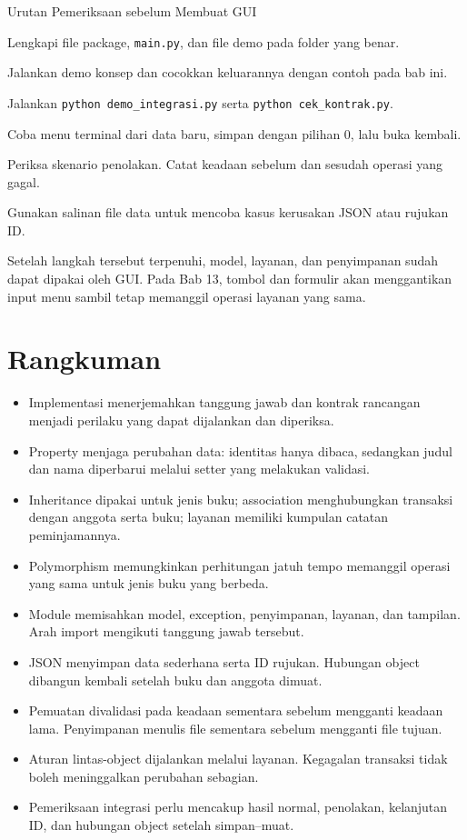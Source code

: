 \begin{langkah}{Urutan Pemeriksaan sebelum Membuat GUI}
  \item Lengkapi file package, \texttt{main.py}, dan file demo pada folder yang benar.
  \item Jalankan demo konsep dan cocokkan keluarannya dengan contoh pada bab ini.
  \item Jalankan \texttt{python demo\_integrasi.py} serta \texttt{python cek\_kontrak.py}.
  \item Coba menu terminal dari data baru, simpan dengan pilihan 0, lalu buka kembali.
  \item Periksa skenario penolakan. Catat keadaan sebelum dan sesudah operasi yang gagal.
  \item Gunakan salinan file data untuk mencoba kasus kerusakan JSON atau rujukan ID.
\end{langkah}

Setelah langkah tersebut terpenuhi, model, layanan, dan penyimpanan sudah dapat dipakai oleh GUI. Pada Bab 13, tombol dan formulir akan menggantikan input menu sambil tetap memanggil operasi layanan yang sama.

\section{Rangkuman}

\begin{itemize}
  \item Implementasi menerjemahkan tanggung jawab dan kontrak rancangan menjadi perilaku yang dapat dijalankan dan diperiksa.
  \item Property menjaga perubahan data: identitas hanya dibaca, sedangkan judul dan nama diperbarui melalui setter yang melakukan validasi.
  \item Inheritance dipakai untuk jenis buku; association menghubungkan transaksi dengan anggota serta buku; layanan memiliki kumpulan catatan peminjamannya.
  \item Polymorphism memungkinkan perhitungan jatuh tempo memanggil operasi yang sama untuk jenis buku yang berbeda.
  \item Module memisahkan model, exception, penyimpanan, layanan, dan tampilan. Arah import mengikuti tanggung jawab tersebut.
  \item JSON menyimpan data sederhana serta ID rujukan. Hubungan object dibangun kembali setelah buku dan anggota dimuat.
  \item Pemuatan divalidasi pada keadaan sementara sebelum mengganti keadaan lama. Penyimpanan menulis file sementara sebelum mengganti file tujuan.
  \item Aturan lintas-object dijalankan melalui layanan. Kegagalan transaksi tidak boleh meninggalkan perubahan sebagian.
  \item Pemeriksaan integrasi perlu mencakup hasil normal, penolakan, kelanjutan ID, dan hubungan object setelah simpan--muat.
\end{itemize}

